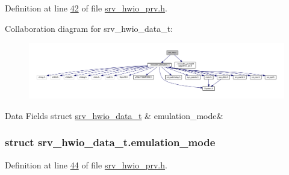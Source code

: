 Definition at line \hyperlink{a00034_source_l00042}{42} of file \hyperlink{a00034_source}{srv\+\_\+hwio\+\_\+prv.\+h}.



Collaboration diagram for srv\+\_\+hwio\+\_\+data\+\_\+t\+:\nopagebreak
\begin{figure}[H]
\begin{center}
\leavevmode
\includegraphics[width=350pt]{df/d5a/a01681}
\end{center}
\end{figure}
\begin{DoxyFields}{Data Fields}
\hypertarget{a00034_a742dceaef1f19ec73ed5acc066127476}{struct \hyperlink{a00034_d9/d00/a00784}{srv\+\_\+hwio\+\_\+data\+\_\+t}}\label{a00034_a742dceaef1f19ec73ed5acc066127476}
&
emulation\+\_\+mode&
\\
\hline

\end{DoxyFields}
\label{d9/d00/a00784}
\hypertarget{a00034_d9/d00/a00784}{}
\subsubsection{struct srv\+\_\+hwio\+\_\+data\+\_\+t.\+emulation\+\_\+mode}


Definition at line \hyperlink{a00034_source_l00044}{44} of file \hyperlink{a00034_source}{srv\+\_\+hwio\+\_\+prv.\+h}.



